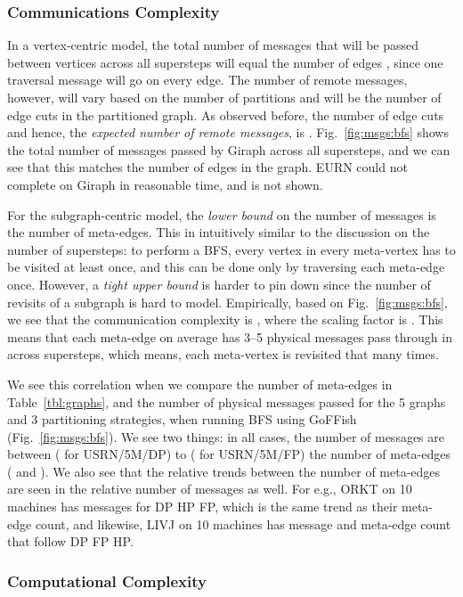 \documentclass[10pt,conference, compsocconf]{IEEEtran}
\begin{document}
\subsubsection{Communications Complexity}
In a vertex-centric model, the total number of messages that will be passed between vertices across all supersteps will equal the number of edges , since one traversal message will go on every edge. The number of remote messages, however, will vary based on the number of partitions and will be the number of edge cuts in the partitioned graph.  As observed before, the number of edge cuts and hence, the \emph{expected number of remote messages}, is . Fig.~\ref{fig:msgs:bfs} shows the total number of messages passed by Giraph across all supersteps, and we can see that this matches the number of edges in the graph. EURN could not complete on Giraph in reasonable time, and is not shown.

For the subgraph-centric model, the \emph{lower bound} on the number of messages is the number of meta-edges. This in intuitively similar to the discussion on the number of supersteps: to perform a BFS, every vertex in every meta-vertex has to be visited at least once, and this can be done only by traversing each meta-edge once. However, a \emph{tight upper bound} is harder to pin down since the number of revisits of a subgraph is hard to model. Empirically, based on Fig.~\ref{fig:msgs:bfs}, we see that the communication complexity is , where the  scaling factor is . This means that each meta-edge on average has 3--5 physical messages pass through in across supersteps, which means, each meta-vertex is revisited that many times.

We see this correlation when we compare the number of meta-edges in Table~\ref{tbl:graphs}, and the number of physical messages passed for the 5 graphs and 3 partitioning strategies, when running BFS using GoFFish (Fig.~\ref{fig:msgs:bfs}). We see two things: in all cases, the number of messages are between  ( for USRN/5M/DP) to  ( for USRN/5M/FP) the number of meta-edges ( and ). We also see that the relative trends between the number of meta-edges are seen in the relative number of messages as well. For e.g., ORKT on 10 machines has messages for DP  HP  FP, which is the same trend as their meta-edge count, and likewise, LIVJ on 10 machines has message and meta-edge count that follow DP  FP  HP.



\subsubsection{{Computational Complexity}}
\end{document}
